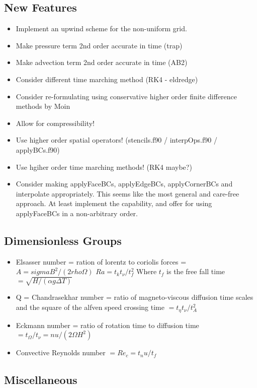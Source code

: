 \documentclass[11pt]{article}
\begin{document}
\subsection{New Features}
\begin{itemize}
\setlength\itemsep{-1em}
\item Implement an upwind scheme for the non-uniform grid.
\item Make pressure term 2nd order accurate in time (trap)
\item Make advection term 2nd order accurate in time (AB2)
\item Consider different time marching method (RK4 - eldredge)
\item Consider re-formulating using conservative higher order finite difference methods by Moin
\item Allow for compressibility!
\item Use higher order spatial operators! (stencils.f90 / interpOps.f90 / applyBCs.f90)
\item Use hgiher order time marching methods! (RK4 maybe?)
\item Consider making applyFaceBCs, applyEdgeBCs, applyCornerBCs and interpolate appropriately. This seems like the most general and care-free approach. At least implement the capability, and offer for using applyFaceBCs in a non-arbitrary order.
\end{itemize}

\subsection{Dimensionless Groups}
\begin{itemize}
\setlength\itemsep{-1em}
\item Elsasser number = ration of lorentz to coriolis forces = $A = sigma B^2 / (2 rho \Omega)$
$Ra = t_k t_{\nu} / t_f^2$ Where $t_f$ is the free fall time $ = \sqrt{ H/(\alpha g \Delta T)} $
\item Q = Chandrasekhar number = ratio of magneto-viscous diffusion time scales and the square of the alfven speed crossing time $ = t_{\eta} t_{\nu} / t_A^2$
\item Eckmann number = ratio of rotation time to diffusion time $ = t_{\Omega} / t_{\nu} = nu / (2 \Omega H^2)$
\item Convective Reynolds number $= Re_c = t_nu / t_f$
\end{itemize}


\subsection{Miscellaneous}
\end{document}
